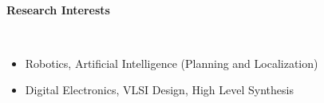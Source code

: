 \documentclass[a4paper,11pt]{article}
\newcommand{\isep}{-2 pt}
\newcommand{\lsep}{-0.5cm}
\newcommand{\resheading}[1]{{\small \colorbox{mygrey}{\begin{minipage}{0.975\textwidth}{\textbf{#1 \vphantom{p\^{E}}}}\end{minipage}}}}
\begin{document}
\hspace{0.5cm}\\
\hspace{0.5cm}\\
\hspace{0.5cm}\\
\hspace{0.5cm}\\
\hspace{0.5cm}\\
\hspace{0.5cm}\\ 
\hspace{0.5cm}\\
\hspace{0.5cm}\\
\hspace{0.5cm}\\
\hspace{0.5cm}\\
\hspace{0.5cm}\\[-0.2cm]

\begin{comment}
\begin{tabular}{m{8cm} m{8cm}} 
    \large{KRISHNA SAVANT SYREDDY}  & 100070056\\
    \large{Electrical Engineering}  & UG Third Year (B.Tech)\\
    \large{Indian Institute of Technology, Bombay} & DOB: 19-06-1993 \\
    \large{\url{sk.savant@iitb.ac.in}} & +919757033532
\end{tabular}

\resheading{\textbf{\large{Education}}}
\begin{itemize}
    \item Undergraduate Degree - IIT Bombay - 2008 to present  - 8.59
    \item Intermediate/+2 - BIE, AP - SR Junior College - 2010 - 90.50
    \item Matriculation - CBSE - Warangal Public School - 2008 - 93.00
\end{itemize}
\end{comment}


\resheading{\textbf{\large Research Interests}} \\[\lsep] 
\begin{itemize} \itemsep \isep
    \item Robotics, Artificial Intelligence (Planning  and Localization)
    \item Digital Electronics, VLSI Design, High Level Synthesis
\end{itemize}
\end{document}
